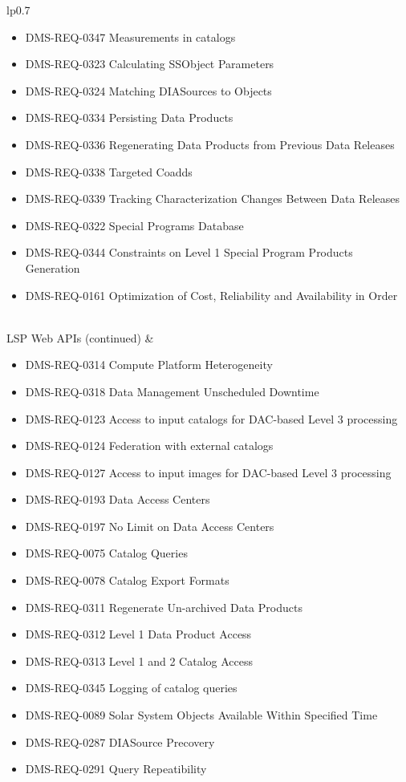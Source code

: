 \begin{xtabular}{lp{0.7\textwidth}}
\begin{itemize}
\item DMS-REQ-0347 Measurements in catalogs
\item DMS-REQ-0323 Calculating SSObject Parameters
\item DMS-REQ-0324 Matching DIASources to Objects
\item DMS-REQ-0334 Persisting Data Products
\item DMS-REQ-0336 Regenerating Data Products from Previous Data Releases
\item DMS-REQ-0338 Targeted Coadds
\item DMS-REQ-0339 Tracking Characterization Changes Between Data Releases
\item DMS-REQ-0322 Special Programs Database
\item DMS-REQ-0344 Constraints on Level 1 Special Program Products Generation
\item DMS-REQ-0161 Optimization of Cost, Reliability and Availability in Order
\end{itemize} \\ \hline
LSP Web APIs (continued) &
\begin{itemize}
\item DMS-REQ-0314 Compute Platform Heterogeneity
\item DMS-REQ-0318 Data Management Unscheduled Downtime
\item DMS-REQ-0123 Access to input catalogs for DAC-based Level 3 processing
\item DMS-REQ-0124 Federation with external catalogs
\item DMS-REQ-0127 Access to input images for DAC-based Level 3 processing
\item DMS-REQ-0193 Data Access Centers
\item DMS-REQ-0197 No Limit on Data Access Centers
\item DMS-REQ-0075 Catalog Queries
\item DMS-REQ-0078 Catalog Export Formats
\item DMS-REQ-0311 Regenerate Un-archived Data Products
\item DMS-REQ-0312 Level 1 Data Product Access
\item DMS-REQ-0313 Level 1 and 2 Catalog Access
\item DMS-REQ-0345 Logging of catalog queries
\item DMS-REQ-0089 Solar System Objects Available Within Specified Time
\item DMS-REQ-0287 DIASource Precovery
\item DMS-REQ-0291 Query Repeatibility

\end{itemize}
\end{xtabular}
